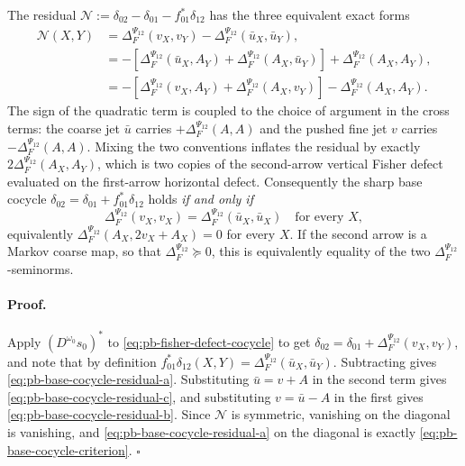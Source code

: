 The residual
$\mathcal N:=\delta_{02}-\delta_{01}-f_{01}^*\delta_{12}$ has the three
equivalent exact forms
\begin{align}
\mathcal N(X,Y)
&=\Delta_F^{\Psi_{12}}(v_X,v_Y)-\Delta_F^{\Psi_{12}}(\bar u_X,\bar u_Y),
\label{eq:pb-base-cocycle-residual-a}\\
&=-\left[\Delta_F^{\Psi_{12}}(\bar u_X,A_Y)
+\Delta_F^{\Psi_{12}}(A_X,\bar u_Y)\right]
+\Delta_F^{\Psi_{12}}(A_X,A_Y),
\label{eq:pb-base-cocycle-residual-b}\\
&=-\left[\Delta_F^{\Psi_{12}}(v_X,A_Y)
+\Delta_F^{\Psi_{12}}(A_X,v_Y)\right]
-\Delta_F^{\Psi_{12}}(A_X,A_Y).
\label{eq:pb-base-cocycle-residual-c}
\end{align}
The sign of the quadratic term is coupled to the choice of argument in the
cross terms: the coarse jet $\bar u$ carries $+\Delta_F^{\Psi_{12}}(A,A)$ and
the pushed fine jet $v$ carries $-\Delta_F^{\Psi_{12}}(A,A)$.  Mixing the two
conventions inflates the residual by exactly
$2\Delta_F^{\Psi_{12}}(A_X,A_Y)$, which is two copies of the second-arrow
vertical Fisher defect evaluated on the first-arrow horizontal defect.
Consequently the sharp base cocycle
$\delta_{02}=\delta_{01}+f_{01}^*\delta_{12}$ holds \emph{if and only if}
\begin{equation}
\Delta_F^{\Psi_{12}}(v_X,v_X)
=\Delta_F^{\Psi_{12}}(\bar u_X,\bar u_X)
\quad\text{for every }X,
\label{eq:pb-base-cocycle-criterion}
\end{equation}
equivalently $\Delta_F^{\Psi_{12}}(A_X,2v_X+A_X)=0$ for every $X$.  If the
second arrow is a Markov coarse map, so that
$\Delta_F^{\Psi_{12}}\succeq0$, this is equivalently equality of the two
$\Delta_F^{\Psi_{12}}$-seminorms.

\paragraph{Proof.}
Apply $(D^{\omega_0}s_0)^*$ to \eqref{eq:pb-fisher-defect-cocycle} to get
$\delta_{02}=\delta_{01}+\Delta_F^{\Psi_{12}}(v_X,v_Y)$, and note that by
definition $f_{01}^*\delta_{12}(X,Y)=\Delta_F^{\Psi_{12}}(\bar u_X,\bar u_Y)$.
Subtracting gives \eqref{eq:pb-base-cocycle-residual-a}.  Substituting
$\bar u=v+A$ in the second term gives
\eqref{eq:pb-base-cocycle-residual-c}, and substituting $v=\bar u-A$ in the
first gives \eqref{eq:pb-base-cocycle-residual-b}.  Since $\mathcal N$ is
symmetric, vanishing on the diagonal is vanishing, and
\eqref{eq:pb-base-cocycle-residual-a} on the diagonal is exactly
\eqref{eq:pb-base-cocycle-criterion}.  $\square$


